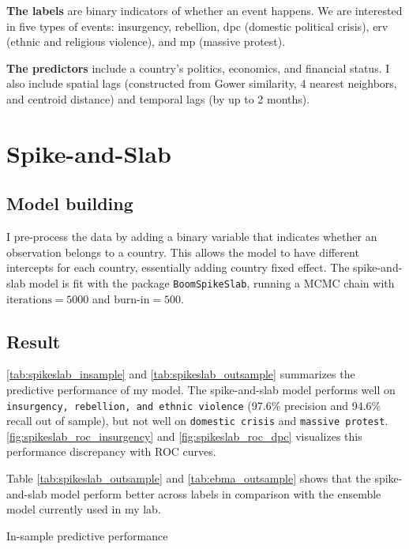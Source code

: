 \documentclass{article}
\begin{document}
\textbf{The labels} are binary indicators of whether an event happens. We are interested in five types of events: insurgency, rebellion, dpc (domestic political crisis), erv (ethnic and religious violence), and mp (massive protest).

\textbf{The predictors} include a country's politics, economics, and financial status. I also include spatial lags (constructed from Gower similarity, 4 nearest neighbors, and centroid distance) and temporal lags (by up to 2 months).

\section{Spike-and-Slab}

\subsection{Model building}
I pre-process the data by adding a binary variable that indicates whether an observation belongs to a country. This allows the model to have different intercepts for each country, essentially adding country fixed effect. The spike-and-slab model is fit with the package \verb|BoomSpikeSlab|, running a MCMC chain with $\text{iterations}=5000$ and $\text{burn-in}=500$. 

\subsection{Result}

\autoref{tab:spikeslab_insample} and \autoref{tab:spikeslab_outsample} summarizes the predictive performance of my model. The spike-and-slab model performs well on \verb|insurgency, rebellion, and ethnic violence| (97.6\% precision and 94.6\% recall out of sample), but not well on \verb|domestic crisis| and \verb|massive protest|. \autoref{fig:spikeslab_roc_insurgency} and \autoref{fig:spikeslab_roc_dpc} visualizes this performance discrepancy with ROC curves.

Table \autoref{tab:spikeslab_outsample} and \autoref{tab:ebma_outsample} shows that the spike-and-slab model perform better across labels in comparison with the ensemble model currently used in my lab.

\begin{table}[H]
\centering

\caption{In-sample predictive performance}
\label{tab:spikeslab_insample}
\end{table}
\end{document}
